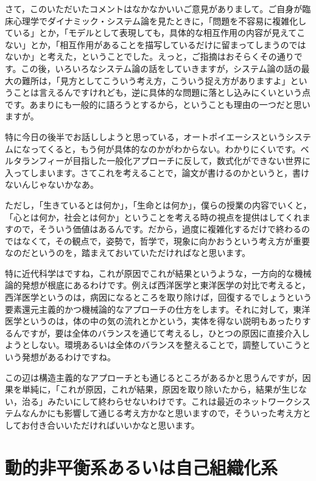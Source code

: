 \documentclass{ltjsbook}
\begin{document}
さて，このいただいたコメントはなかなかいいご意見がありまして。ご自身が臨床心理学でダイナミック・システム論を見たときに，「問題を不容易に複雑化している」とか，「モデルとして表現しても，具体的な相互作用の内容が見えてこない」とか，「相互作用があることを描写しているだけに留まってしまうのではないか」と考えた，ということでした。えっと，ご指摘はおそらくその通りです。この後，いろいろなシステム論の話をしていきますが，システム論の話の最大の難所は，「見方としてこういう考え方，こういう捉え方がありますよ」ということは言えるんですけれども，逆に具体的な問題に落とし込みにくいという点です。あまりにも一般的に語ろうとするから，ということも理由の一つだと思いますが。

特に今日の後半でお話ししようと思っている，オートポイエーシスというシステムになってくると，もう何が具体的なのかがわからない。わかりにくいです。ベルタランフィーが目指した一般化アプローチに反して，数式化ができない世界に入ってしまいます。さてこれを考えることで，論文が書けるのかというと，書けないんじゃないかなあ。

ただし，「生きているとは何か」，「生命とは何か」，僕らの授業の内容でいくと，「心とは何か，社会とは何か」ということを考える時の視点を提供はしてくれますので，そういう価値はあるんです。だから，過度に複雑化するだけで終わるのではなくて，その観点で，姿勢で，哲学で，現象に向かおうという考え方が重要なのだというのを，踏まえておいていただければなと思います。

特に近代科学はですね，これが原因でこれが結果というような，一方向的な機械論的発想が根底にあるわけです。例えば西洋医学と東洋医学の対比で考えると，西洋医学というのは，病因になるところを取り除けば，回復するでしょうという要素還元主義的かつ機械論的なアプローチの仕方をします。それに対して，東洋医学というのは，体の中の気の流れとかという，実体を得ない説明もあったりするんですが，要は全体のバランスを通じて考えるし，ひとつの原因に直接介入しようとしない。環境あるいは全体のバランスを整えることで，調整していこうという発想があるわけですね。

この辺は構造主義的なアプローチとも通じるところがあるかと思うんですが，因果を単純に，「これが原因，これが結果，原因を取り除いたから，結果が生じない，治る」みたいにして終わらせないわけです。これは最近のネットワークシステムなんかにも影響して通じる考え方かなと思いますので，そういった考え方としてお付き合いいただければいいかなと思います。

\section{動的非平衡系あるいは自己組織化系}
\end{document}
